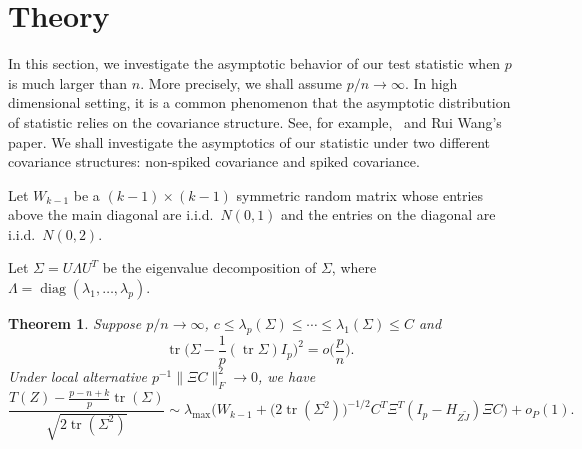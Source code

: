 \documentclass[review]{elsarticle}
\DeclareMathOperator{\mytr}{tr}
\DeclareMathOperator{\mydiag}{diag}
\theoremstyle{plain}
\newtheorem{theorem}{\quad\quad Theorem}
\theoremstyle{definition}
\theoremstyle{remark}
\begin{document}
   
   
   










\section{Theory}

In this section, we investigate the asymptotic behavior of our test statistic when $p$ is much larger than $n$.
More precisely, we shall assume $p/n\to\infty$.
In high dimensional setting, it is a common phenomenon that the asymptotic distribution of statistic relies on the covariance structure.
See, for example,~\cite{Ma2015A} and Rui Wang's paper.
We shall investigate the asymptotics of our statistic under two different covariance structures: non-spiked covariance and spiked covariance.


Let $W_{k-1}$ be a $(k-1)\times(k-1)$ symmetric random matrix whose entries above the main diagonal are i.i.d.\ $N(0,1)$ and the entries on the diagonal are i.i.d.\ $N(0,2)$.


Let $\Sigma= U\Lambda U^T$ be the eigenvalue decomposition of $\Sigma$, where $\Lambda =\mydiag (\lambda_1,\ldots,\lambda_p)$.


\begin{theorem}\label{nonSpiked}
    Suppose $p/n\to \infty$, $c\leq \lambda_p(\Sigma)\leq \cdots\leq \lambda_1(\Sigma)\leq C$ and
    $$
    \mytr\Big(\Sigma-\frac{1}{p}(\mytr\Sigma)I_p\Big)^2=o\big(\frac{p}{n}\big).
    $$
    Under local alternative $p^{-1}\|\Xi C\|_F^2\to 0$,
    we have
    $$
    \frac{T(Z)-\frac{p-n+k}{p}\mytr(\Sigma)}{\sqrt{2\mytr(\Sigma^2)}}
    \sim
    \lambda_{\max}\Big( W_{k-1} +\big(2\mytr(\Sigma^2)\big)^{-1/2} C^T \Xi^T (I_p-H_{Z\tilde{J}})\Xi C\Big)+o_P(1).
    $$
\end{theorem}
\end{document}
